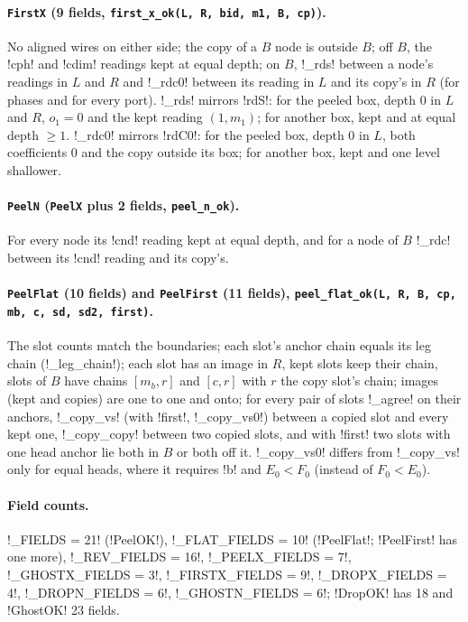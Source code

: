 {{{\paragraph{\texttt{FirstX} (9 fields, \texttt{first\_x\_ok(L, R, bid, m1, B, cp)}).} No aligned
wires on either side; the copy of a $B$ node is outside $B$; off $B$, the \lexcode!cph! and
\lexcode!cdim! readings kept at equal depth; on $B$, \lexpy!_rds! between a node's readings in $L$ and
$R$ and \lexpy!_rdc0! between its reading in $L$ and its copy's in $R$ (for phases and for every
port). \lexpy!_rds! mirrors \lexlean!rdS!: for the peeled box, depth 0 in $L$ and $R$, $o_1 = 0$ and the
kept reading $(1, m_1)$; for another box, kept and at equal depth $\geq 1$. \lexpy!_rdc0! mirrors
\lexlean!rdC0!: for the peeled box, depth 0 in $L$, both coefficients 0 and the copy outside its box;
for another box, kept and one level shallower.

\paragraph{\texttt{PeelN} (\texttt{PeelX} plus 2 fields, \texttt{peel\_n\_ok}).} For every node its
\lexcode!cnd! reading kept at equal depth, and for a node of $B$ \lexpy!_rdc! between its \lexcode!cnd!
reading and its copy's.

\paragraph{\texttt{PeelFlat} (10 fields) and \texttt{PeelFirst} (11 fields),
\texttt{peel\_flat\_ok(L, R, B, cp, mb, c, sd, sd2, first)}.} The slot counts match the
boundaries; each slot's anchor chain equals its leg chain (\lexpy!_leg_chain!); each slot has an
image in $R$, kept slots keep their chain, slots of $B$ have chains $[m_b, r]$ and $[c, r]$ with
$r$ the copy slot's chain; images (kept and copies) are one to one and onto; for every pair of
slots \lexpy!_agree! on their anchors, \lexpy!_copy_vs! (with \lexcode!first!, \lexpy!_copy_vs0!) between a
copied slot and every kept one, \lexpy!_copy_copy! between two copied slots, and with \lexcode!first!
two slots with one head anchor lie both in $B$ or both off it. \lexpy!_copy_vs0! differs from
\lexpy!_copy_vs! only for equal heads, where it requires \lexcode!b! and $E_0 < F_0$ (instead of
$F_0 < E_0$).

\paragraph{Field counts.} \lexpy!_FIELDS = 21! (\lexlean!PeelOK!), \lexpy!_FLAT_FIELDS = 10!
(\lexlean!PeelFlat!; \lexlean!PeelFirst! has one more), \lexpy!_REV_FIELDS = 16!,
\lexpy!_PEELX_FIELDS = 7!, \lexpy!_GHOSTX_FIELDS = 3!, \lexpy!_FIRSTX_FIELDS = 9!,
\lexpy!_DROPX_FIELDS = 4!, \lexpy!_DROPN_FIELDS = 6!, \lexpy!_GHOSTN_FIELDS = 6!; \lexlean!DropOK! has 18 and
\lexlean!GhostOK! 23 fields.

}}}
